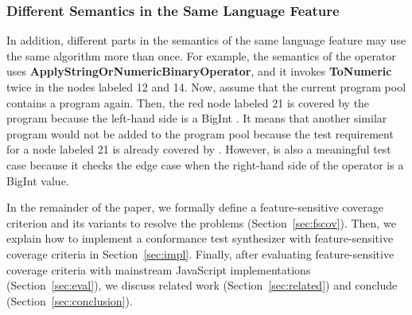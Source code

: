 
\subsubsection{Different Semantics in the Same Language
Feature}\label{sec:same-feat}
In addition, different parts in the semantics of the same language feature
may use the same algorithm more than once.
For example, the semantics of the \scode{+} operator uses
\textbf{ApplyStringOrNumericBinaryOperator}, and it invokes
\textbf{ToNumeric} twice in the nodes labeled 12 and 14.
Now, assume that the current program pool contains a program  again.
Then, the red node labeled 21 is covered by the program  because
the left-hand side is a BigInt .
It means that another similar program  would not be added to the
program pool because the test requirement for a node labeled 21 is already covered
by .
However,  is also a meaningful test case because it checks the
edge case when the right-hand side of the \scode{+} operator is a BigInt value.

In the remainder of the paper, we formally define a feature-sensitive coverage
criterion and its variants to resolve the problems (Section~\ref{sec:fscov}).
Then, we explain how to implement a conformance test synthesizer with
feature-sensitive coverage criteria in Section~\ref{sec:impl}.
Finally, after evaluating feature-sensitive coverage criteria with
mainstream JavaScript implementations (Section~\ref{sec:eval}),
we discuss related work (Section~\ref{sec:related})
and conclude (Section~\ref{sec:conclusion}).
